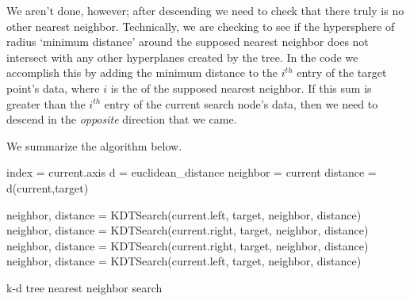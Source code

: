 We aren't done, however; after descending we need to check that there truly is no other nearest neighbor.
Technically, we are checking to see if the hypersphere of radius `minimum distance' around the supposed nearest neighbor does not intersect with any other hyperplanes created by the tree.
In the code we accomplish this by adding the minimum distance to the $i^{th}$ entry of the target point's data, where $i$ is the  of the supposed nearest neighbor.
If this sum is greater than the $i^{th}$ entry of the current search node's data, then we need to descend in the \emph{opposite} direction that we came.

We summarize the algorithm below.

\begin{algorithm}
\begin{algorithmic}[1]
\State index = current.axis
\State d = euclidean\_distance
		\State neighbor = current
		\State distance = d(current,target)
	\EndIf
	
		\State neighbor, distance = KDTSearch(current.left, target,
			\State									neighbor, distance)
			\State neighbor, distance = KDTSearch(current.right, target,
				\State									neighbor, distance)
		\EndIf
	\Else
		\State neighbor, distance = KDTSearch(current.right, target,
			\State									neighbor, distance)
			\State neighbor, distance = KDTSearch(current.left, target,
				\State									neighbor, distance)
		\EndIf
	\EndIf
\EndProcedure
\end{algorithmic}
\caption{k-d tree nearest neighbor search}
\label{alg:kdneighborz}
\end{algorithm}

